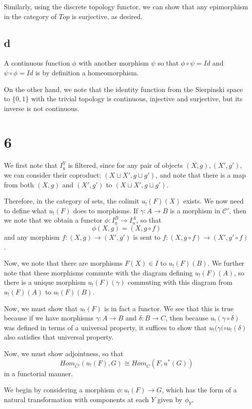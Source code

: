 \documentclass[a4paper]{article}
\theoremstyle{named}
\let\tempa\section
\renewcommand{\section}[1]{\tempa*{#1}}
\let\tempb\subsection
\renewcommand{\subsection}[1]{\tempb*{#1}}
\begin{document}
Similarly, using the discrete topology functor, we can show that any epimorphism in the category of $Top$ is surjective, as desired.

\subsection{d}
A continuous function $\phi$ with another morphism $\psi$ so that $\phi \circ \psi = Id$ and $\psi \circ \phi = Id$ is by definition a homeomorphism.

On the other hand, we note that the identity function from the Sierpinski space to $\{0,1\}$ with the trivial topology is continuous, injective and surjective, but its inverse is not continuous.

\section{6}
We first note that $I_u^Y$ is filtered, since for any pair of objects $(X, g), (X', g')$, we can consider their coproduct: $(X \sqcup X', g\sqcup g')$, and note that there is a map from both $(X, g)$ and $(X', g')$ to $(X \sqcup X', g\sqcup g')$. 

Therefore, in the category of sets, the colimit $u_!(F)(X)$ exists. We now need to define what $u_{!}(F)$ does to morphisms. If $\gamma : A \rightarrow B$ is a morphism in $\mathcal{C}'$, then we note that we obtain a functor $\phi   :I_u^{B} \rightarrow I_u^A$, so that
\[
    \phi(X, g) = (X, g \circ f)
\]
and any morphism $f : (X, g)\rightarrow (X', g')$ is sent to $f:(X, g \circ f)\rightarrow (X', g' \circ f)$. 

Now, we note that there are morphisms $F(X) \in I$ to $u_!(F)(B)$. We further note that these morphisms commute with the diagram defining $u_!(F)(A)$, so there is a unique morphism $u_!(F)(\gamma)$ commuting with this diagram from $u_!(F)(A)$ to $u_!(F)(B)$.

Now, we must show that $u_!(F)$ is in fact a functor. We see that this is true because if we have morphisms $\gamma : A \rightarrow B$ and $\delta : B \rightarrow C$, then because $u_!(\gamma \circ \delta)$ was defined in terms of a universal property, it suffices to show that $u_!(\gamma( \circ u_!(\delta)$ also satisfies that universal property.

Now, we must show adjointness, so that 
\[
Hom_{\hat{C}'}(u_!(F), G) \cong Hom_{\hat{C}}(F, u^*(G))
\]
in a functorial manner. 

We begin by considering a morphism $\phi: u_!(F) \rightarrow G$, which has the form of a natural transformation with components at each $Y$ given by $\phi_Y$. 
\end{document}

